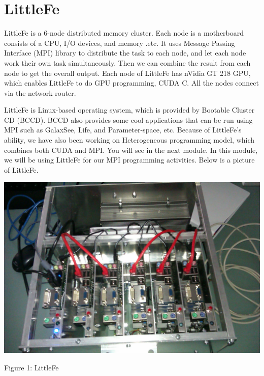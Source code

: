 \documentclass[letterpaper,10pt,openany,oneside]{sphinxmanual}
\begin{document}
\section{LittleFe}
\label{LocalClusterConfig/LocalClusterConfig:littlefe}
LittleFe is a 6-node distributed memory cluster. Each node is a motherboard consists of a CPU, I/O devices, and memory .etc. It uses Message Passing Interface (MPI) library to distribute the task to each node, and let each node work their own task simultaneously. Then we can combine the result from each node to get the overall output. Each node of LittleFe has nVidia GT 218 GPU, which enables LittleFe to do GPU programming, CUDA C. All the nodes connect via the network router.

LittleFe is Linux-based operating system, which is provided by Bootable Cluster CD (BCCD). BCCD also provides some cool applications that can be run using MPI such as GalaxSee, Life, and Parameter-space, etc. Because of LittleFe's ability, we have also been working on Heterogeneous programming model, which combines both CUDA and MPI. You will see in the next module. In this module, we will be using LittleFe for our MPI programming activities. Below is a picture of LittleFe.

{\hfill\includegraphics{LittleFe.jpg}\hfill}

\begin{center}Figure 1: LittleFe
\end{center}
\end{document}
